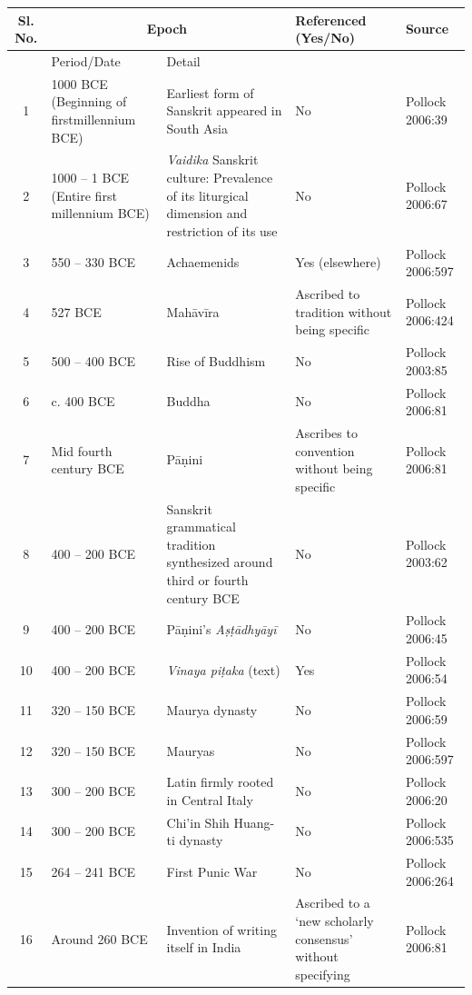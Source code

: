 \begin{longtable}{|c|p{1.9cm}|p{1.9cm}|p{1.5cm}|p{1.1cm}|}
\hline
Sl. No. & \multicolumn{2}{c|}{Epoch} & Referenced (Yes/No) & Source \\
\hline
 & Period/Date & Detail &  &  \\
\hline
1 & 1000 BCE (Beginning of first\break millennium BCE) & Earliest form of Sanskrit appeared in South Asia & No & Pollock 2006:39 \\
\hline
2 & 1000 – 1 BCE (Entire first millennium BCE) & \textit{Vaidika} Sanskrit culture: Prevalence of its liturgical dimension and restriction of its use & No & Pollock 2006:67 \\
\hline
3 & 550 – 330 BCE & Achaemenids\index{Achaemenids} & Yes (elsewhere) & Pollock 2006:597 \\
\hline
4 & 527 BCE & Mahāvīra\index{Mahavira@Mahāvīra} & Ascribed to tradi\break tion without being specific & Pollock 2006:424 \\
\hline
5 & 500 – 400 BCE & Rise of Buddhism\index{Buddhism} & No & Pollock\index{Pollock, Sheldon} 2003:85 \\
\hline
6 & c. 400 BCE & Buddha\index{Buddha, the} & No & Pollock 2006:81 \\
\hline
7 & Mid fourth century BCE & Pāṇini\index{Panini@Pāṇini} & Ascribes to conven\break tion without being specific & Pollock 2006:81 \\
\hline
8 & 400 – 200 BCE & Sanskrit grammatical tradition synthesized around third or fourth century BCE & No & Pollock 2003:62 \\
\hline
9 & 400 – 200 BCE & Pāṇini’s \textit{Aṣṭādhyāyī}\index{Astadhyayi@\textit{Aṣṭādhyāyī}} & No & Pollock 2006:45 \\
\hline
10 & 400 – 200 BCE & \textit{Vinaya piṭaka} (text) & Yes & Pollock 2006:54 \\
\hline
11 & 320 – 150 BCE & Maurya dynasty & No & Pollock 2006:59 \\
\hline
12 & 320 – 150 BCE & Mauryas & No & Pollock 2006:597 \\
\hline
13 & 300 – 200 BCE & Latin firmly rooted in Central Italy & No & Pollock 2006:20 \\
\hline
14 & 300 – 200 BCE & Chi’in Shih Huang-ti dynasty & No & Pollock 2006:535 \\
\hline
15 & 264 – 241 BCE & First Punic War & No & Pollock 2006:264 \\
\hline
16 & Around 260 BCE & Invention of writing itself in India & Ascribed to a ‘new scholarly consensus’ without specifying & Pollock 2006:81 \\

\end{longtable}
